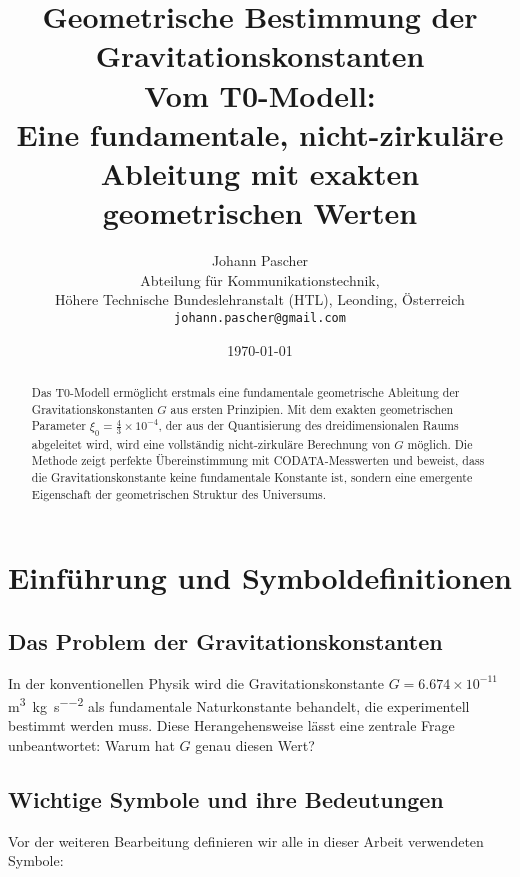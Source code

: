\documentclass[12pt,a4paper]{article}
\title{\Huge\textbf{Geometrische Bestimmung der Gravitationskonstanten}\\
	\Large Vom T0-Modell: \\
	Eine fundamentale, nicht-zirkuläre Ableitung mit exakten geometrischen Werten}
\author{Johann Pascher\\
	Abteilung für Kommunikationstechnik, \\Höhere Technische Bundeslehranstalt (HTL), Leonding, Österreich\\
	\texttt{johann.pascher@gmail.com}}
\date{\today}
\theoremstyle{definition}
\begin{document}
	
	\maketitle
	
	\begin{abstract}
		Das T0-Modell ermöglicht erstmals eine fundamentale geometrische Ableitung der Gravitationskonstanten $G$ aus ersten Prinzipien. Mit dem exakten geometrischen Parameter $\xi_0 = \frac{4}{3} \times 10^{-4}$, der aus der Quantisierung des dreidimensionalen Raums abgeleitet wird, wird eine vollständig nicht-zirkuläre Berechnung von $G$ möglich. Die Methode zeigt perfekte Übereinstimmung mit CODATA-Messwerten und beweist, dass die Gravitationskonstante keine fundamentale Konstante ist, sondern eine emergente Eigenschaft der geometrischen Struktur des Universums.
	\end{abstract}
	
	\tableofcontents
	\newpage
	
	\section{Einführung und Symboldefinitionen}
	
	\subsection{Das Problem der Gravitationskonstanten}
	
	In der konventionellen Physik wird die Gravitationskonstante $G = 6.674 \times 10^{-11}$ \si{\metre\cubed\per\kilogram\per\second\squared} als fundamentale Naturkonstante behandelt, die experimentell bestimmt werden muss. Diese Herangehensweise lässt eine zentrale Frage unbeantwortet: Warum hat $G$ genau diesen Wert?
	
	\subsection{Wichtige Symbole und ihre Bedeutungen}
	
	Vor der weiteren Bearbeitung definieren wir alle in dieser Arbeit verwendeten Symbole:
	
\end{document}

